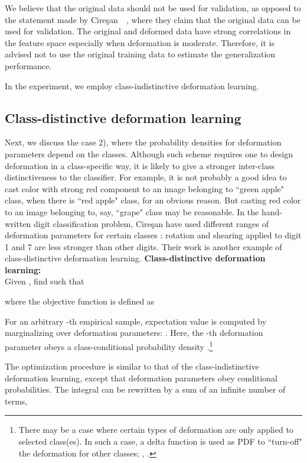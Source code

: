 \documentclass[10pt,twocolumn,letterpaper]{article}
\begin{document}
We believe that the original data should not be used for validation,
as opposed to the statement made by Cire{\c s}an~\etal~\cite{Ciresan:2012b, Ciresan:2010},
where they claim that the original data can be used for validation.
The original and deformed data have strong correlations in the feature space 
especially when deformation is moderate.
Therefore, it is advised not to use the original training data to estimate the generalization performance.

In the experiment, we employ class-indistinctive deformation learning.

\subsection{Class-distinctive deformation learning}

Next, we discuss the case 2), where
the probability densities for deformation parameters depend on the classes.
Although such scheme requires one to design deformation in a
class-specific way, it is likely to give a stronger inter-class
distinctiveness to the classifier.
For example,
it is not probably a good idea to cast color with strong red component
to an image belonging to ``green apple" class, when
there is ``red apple" class, for an obvious reason.
But casting red color to an image belonging to, say, ``grape" class may be reasonable.
In the hand-written digit classification problem, 
Cire{\c s}an \etal have used different ranges of deformation
parameters for certain classes
\cite{Ciresan:2010}:
rotation and shearing applied to digit 1 and 7 are
less stronger than other digits.
Their work is another example of class-distinctive deformation learning.
\newline
\newline
{\bf Class-distinctive deformation learning:} \\
Given , find  such that

where the objective function  is defined as


For an arbitrary -th empirical sample,
expectation value is computed by marginalizing over 
deformation parameters:
.
Here, the -th deformation parameter 
obeys a class-conditional probability density .\footnote{There may be a case where 
certain types of deformation are only applied to selected class(es). In such a
case, a delta function is used as PDF to ``turn-off" the deformation for other classes; 
\ie, .}

The optimization procedure is similar to that of the class-indistinctive
deformation learning, except that deformation parameters obey
conditional probabilities.
The integral can be rewritten by a sum of an infinite number of terms,
\end{document}
